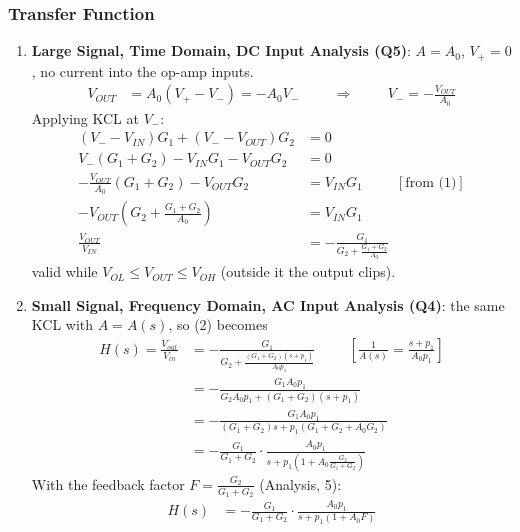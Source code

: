 \subsubsection{Transfer Function}
\begin{enumerate}
  \item \textbf{Large Signal, Time Domain, DC Input Analysis (Q5)}: \(A = A_0\),
    \(V_+ = 0\), no current into the op-amp inputs.
    \begin{align*}
      V_{OUT} &= A_0(V_+ - V_-) = -A_0 V_- \hspace{1cm} \Rightarrow \hspace{1cm} V_- = -\frac{V_{OUT}}{A_0} \tag{1}
    \end{align*}
    Applying KCL at \(V_-\):
    \begin{align*}
      (V_- - V_{IN}) G_1 + (V_- - V_{OUT}) G_2 &= 0 \\
      V_-(G_1 + G_2) - V_{IN} G_1 - V_{OUT} G_2 &= 0 \\
      -\frac{V_{OUT}}{A_0}(G_1 + G_2) - V_{OUT} G_2 &= V_{IN} G_1 \hspace{1cm} [\text{from (1)}] \\
      -V_{OUT}\left(G_2 + \frac{G_1 + G_2}{A_0}\right) &= V_{IN} G_1 \\
      \frac{V_{OUT}}{V_{IN}} &= -\frac{G_1}{G_2 + \frac{G_1 + G_2}{A_0}} \tag{2}
    \end{align*}
    valid while \(V_{OL} \leq V_{OUT} \leq V_{OH}\) (outside it the output clips).
  \item \textbf{Small Signal, Frequency Domain, AC Input Analysis (Q4)}: the same KCL with
    \(A = A(s)\), so (2) becomes
    \begin{align*}
      H(s) = \frac{V_{out}}{V_{in}} &= -\frac{G_1}{G_2 + \frac{(G_1 + G_2)(s + p_1)}{A_0 p_1}} \hspace{1cm} \left[\tfrac{1}{A(s)} = \tfrac{s + p_1}{A_0 p_1}\right] \\
      &= -\frac{G_1 A_0 p_1}{G_2 A_0 p_1 + (G_1 + G_2)(s + p_1)} \\
      &= -\frac{G_1 A_0 p_1}{(G_1 + G_2)s + p_1(G_1 + G_2 + A_0 G_2)} \\
      &= -\frac{G_1}{G_1 + G_2}\cdot\frac{A_0 p_1}{s + p_1\left(1 + A_0\frac{G_2}{G_1 + G_2}\right)}
    \end{align*}
    With the feedback factor \(F = \frac{G_2}{G_1 + G_2}\) (Analysis, 5):
    \begin{align*}
      H(s) &= -\frac{G_1}{G_1 + G_2}\cdot\frac{A_0 p_1}{s + p_1(1 + A_0 F)} \tag{3}
    \end{align*}
\end{enumerate}

